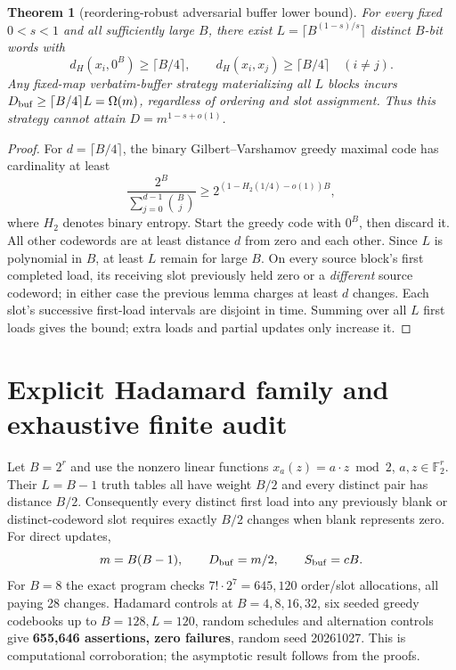 \documentclass[11pt]{article}
\newtheorem{theorem}{Theorem}
\begin{document}
\begin{theorem}[reordering-robust adversarial buffer lower bound]
For every fixed \(0<s<1\) and all sufficiently large \(B\), there exist \(L=\lceil B^{(1-s)/s}\rceil\) distinct \(B\)-bit words with
\[
d_H(x_i,0^B)\ge\lceil B/4\rceil,\qquad
d_H(x_i,x_j)\ge\lceil B/4\rceil\quad(i\ne j).
\]
Any fixed-map verbatim-buffer strategy materializing all \(L\) blocks incurs \(D_{\rm buf}\ge \lceil B/4\rceil L=\Omega(m)\), regardless of ordering and slot assignment. Thus this strategy cannot attain \(D=m^{1-s+o(1)}\).
\end{theorem}
\begin{proof}
For \(d=\lceil B/4\rceil\), the binary Gilbert--Varshamov greedy maximal code has cardinality at least
\[
\frac{2^B}{\sum_{j=0}^{d-1}\binom Bj}
\ge 2^{(1-H_2(1/4)-o(1))B},
\]
where \(H_2\) denotes binary entropy. Start the greedy code with \(0^B\), then discard it. All other codewords are at least distance \(d\) from zero and each other. Since \(L\) is polynomial in \(B\), at least \(L\) remain for large \(B\). On every source block's first completed load, its receiving slot previously held zero or a \emph{different} source codeword; in either case the previous lemma charges at least \(d\) changes. Each slot's successive first-load intervals are disjoint in time. Summing over all \(L\) first loads gives the bound; extra loads and partial updates only increase it.
\end{proof}

\section{Explicit Hadamard family and exhaustive finite audit}
Let \(B=2^r\) and use the nonzero linear functions \(x_a(z)=a\cdot z\bmod2\), \(a,z\in\mathbb F_2^r\). Their \(L=B-1\) truth tables all have weight \(B/2\) and every distinct pair has distance \(B/2\). Consequently every distinct first load into any previously blank or distinct-codeword slot requires exactly \(B/2\) changes when blank represents zero. For direct updates,
\[
m=B(B-1),\qquad D_{\rm buf}=m/2,\qquad S_{\rm buf}=cB.
\]
For \(B=8\) the exact program checks \(7!\cdot 2^7=645{,}120\) order/slot allocations, all paying 28 changes. Hadamard controls at \(B=4,8,16,32\), six seeded greedy codebooks up to \(B=128,L=120\), random schedules and alternation controls give \textbf{655,646 assertions, zero failures}, random seed 20261027. This is computational corroboration; the asymptotic result follows from the proofs.
\end{document}
